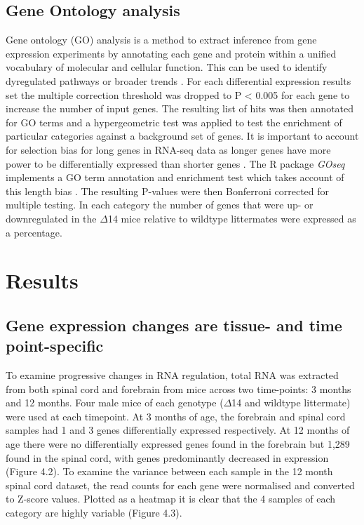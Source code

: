 \subsection{Gene Ontology analysis}
Gene ontology (GO) analysis is a method to extract inference from gene expression experiments by annotating each gene and protein within a unified vocabulary of molecular and cellular function. This can be used to identify dyregulated pathways or broader trends \citep{Ashburner2000}. For each differential expression results set the multiple correction threshold was dropped to P < 0.005 for each gene to increase the number of input genes. The resulting list of hits was then annotated for GO terms and a hypergeometric test was applied to test the enrichment of particular categories against a background set of genes. It is important to account for selection bias for long genes in RNA-seq data as longer genes have more power to be differentially expressed than shorter genes \citep{Young2010}. The R package \textit{GOseq} implements a GO term annotation and enrichment test which takes account of this length bias \citep{Young2010}. The resulting P-values were then Bonferroni corrected for multiple testing. In each category the number of genes that were up- or downregulated in the $\Delta$14 mice relative to wildtype littermates were expressed as a percentage. 

\section{Results}

\subsection{Gene expression changes are tissue- and time point-specific}

To examine progressive changes in RNA regulation, total RNA was extracted from both spinal cord and forebrain from mice across two time-points: 3 months and 12 months. Four male mice of each genotype ($\Delta$14 and wildtype littermate) were used at each timepoint. At 3 months of age, the forebrain and spinal cord samples had 1 and 3 genes differentially expressed respectively. At 12 months of age there were no differentially expressed genes found in the forebrain but 1,289 found in the spinal cord, with genes predominantly decreased in expression (Figure 4.2). To examine the variance between each sample in the 12 month spinal cord dataset, the read counts for each gene were normalised and converted to Z-score values. Plotted as a heatmap it is clear that the 4 samples of each category are highly variable (Figure 4.3).

